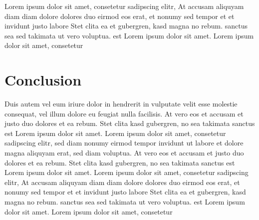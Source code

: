 \documentclass[11pt,twoside,a4paper,titlepage]{article}
\begin{document}
Lorem ipsum dolor sit amet, consetetur sadipscing elitr, At accusam aliquyam diam diam dolore dolores duo eirmod eos erat, et nonumy sed tempor et et invidunt justo labore Stet clita ea et gubergren, kasd magna no rebum. sanctus sea sed takimata ut vero voluptua. est Lorem ipsum dolor sit amet. Lorem ipsum dolor sit amet, consetetur\\




\section{Conclusion}

Duis autem vel eum iriure dolor in hendrerit in vulputate velit esse molestie consequat, vel illum dolore eu feugiat nulla facilisis. At vero eos et accusam et justo duo dolores et ea rebum. Stet clita kasd gubergren, no sea takimata sanctus est Lorem ipsum dolor sit amet. Lorem ipsum dolor sit amet, consetetur sadipscing elitr, sed diam nonumy eirmod tempor invidunt ut labore et dolore magna aliquyam erat, sed diam voluptua. At vero eos et accusam et justo duo dolores et ea rebum. Stet clita kasd gubergren, no sea takimata sanctus est Lorem ipsum dolor sit amet. Lorem ipsum dolor sit amet, consetetur sadipscing elitr, At accusam aliquyam diam diam dolore dolores duo eirmod eos erat, et nonumy sed tempor et et invidunt justo labore Stet clita ea et gubergren, kasd magna no rebum. sanctus sea sed takimata ut vero voluptua. est Lorem ipsum dolor sit amet. Lorem ipsum dolor sit amet, consetetur\\




%
%
\end{document}
